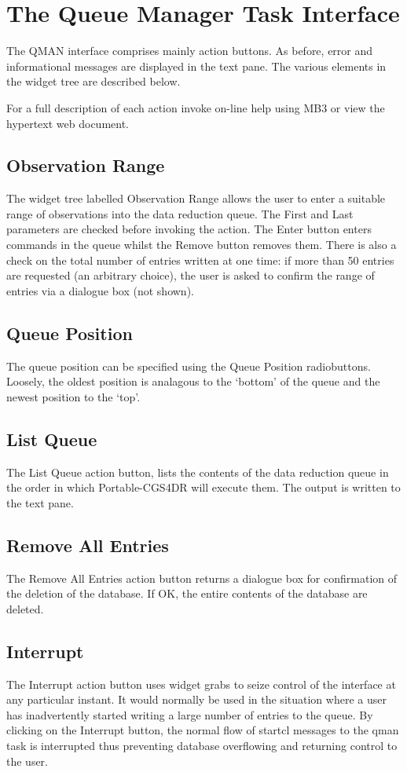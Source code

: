 \documentclass[a4paper]{book}
\renewcommand{\_}{{\tt\char'137}}
\begin{document}
\section{The Queue Manager Task Interface}
The QMAN interface comprises mainly action buttons.
As before, error and informational messages are displayed in the text pane.
The various elements in the widget tree are described below.

For a full description of each action invoke on-line help using MB3 or view the hypertext web document.

\subsection{Observation Range}
The widget tree labelled {\sf Observation Range} allows the user to enter a
suitable range of observations into the data reduction queue. The {\sf First}
and {\sf Last} parameters are checked before invoking the action. The {\sf Enter}
button enters commands in the queue whilst the {\sf Remove} button removes them.
There is also a check on the total number of entries written at one time: if
more than 50 entries are requested (an arbitrary choice), the user is asked to
confirm the range of entries via a dialogue box (not shown).

\subsection{Queue Position}
The queue position can be specified using the {\sf Queue Position} radiobuttons.
Loosely, the oldest position is analagous to the `bottom' of the queue and the
newest position to the `top'.

\subsection{List Queue}
The {\sf List Queue} action button, lists the contents of the data reduction
queue in the order in which Portable-CGS4DR will execute them. The output is written to the text pane.

\subsection{Remove All Entries}
The {\sf Remove All Entries} action button returns a dialogue box
for confirmation of the deletion of the database. If {\sf OK}, the entire contents of the database
are deleted.

\subsection{Interrupt}
The {\sf Interrupt} action button uses widget grabs to seize control of the interface at
any particular instant. It would normally be used in the situation where a user
has inadvertently started writing a large number of entries to the queue. By clicking
on the {\sf Interrupt} button, the normal flow of {\sc startcl} messages to the
qman task is interrupted thus preventing database overflowing and returning control to
the user.
\end{document}
